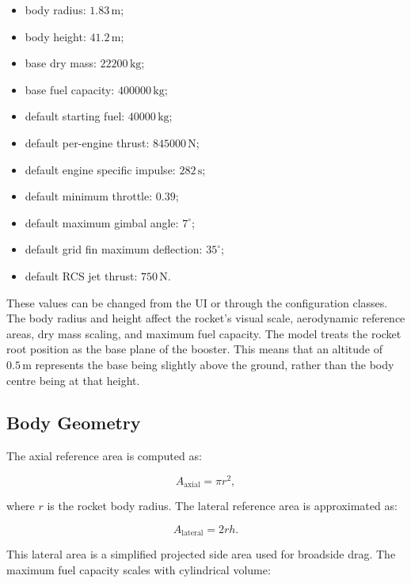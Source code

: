 \documentclass[12pt,a4paper]{article}
\begin{document}
\begin{itemize}
    \item body radius: \(1.83\,\mathrm{m}\);
    \item body height: \(41.2\,\mathrm{m}\);
    \item base dry mass: \(22200\,\mathrm{kg}\);
    \item base fuel capacity: \(400000\,\mathrm{kg}\);
    \item default starting fuel: \(40000\,\mathrm{kg}\);
    \item default per-engine thrust: \(845000\,\mathrm{N}\);
    \item default engine specific impulse: \(282\,\mathrm{s}\);
    \item default minimum throttle: \(0.39\);
    \item default maximum gimbal angle: \(7^\circ\);
    \item default grid fin maximum deflection: \(35^\circ\);
    \item default RCS jet thrust: \(750\,\mathrm{N}\).
\end{itemize}

These values can be changed from the UI or through the configuration classes. The body radius and height affect the rocket's visual scale, aerodynamic reference areas, dry mass scaling, and maximum fuel capacity. The model treats the rocket root position as the base plane of the booster. This means that an altitude of \(0.5\,\mathrm{m}\) represents the base being slightly above the ground, rather than the body centre being at that height.

\subsection{Body Geometry}

The axial reference area is computed as:

\begin{equation}
A_{\mathrm{axial}} = \pi r^2,
\end{equation}

where \(r\) is the rocket body radius. The lateral reference area is approximated as:

\begin{equation}
A_{\mathrm{lateral}} = 2rh.
\end{equation}

This lateral area is a simplified projected side area used for broadside drag. The maximum fuel capacity scales with cylindrical volume:
\end{document}
